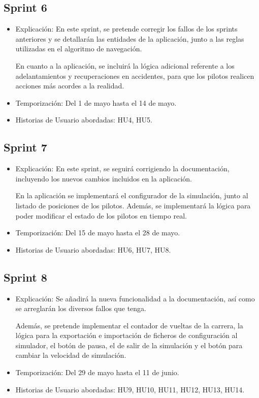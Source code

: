 \newpage

\subsection{Sprint 6}

\begin{itemize}
    \item Explicación: En este sprint, se pretende corregir los fallos de los sprints anteriores y se detallarán las entidades de la aplicación, junto a las reglas utilizadas en el algoritmo de navegación.
    
    En cuanto a la aplicación, se incluirá la lógica adicional referente a los adelantamientos y recuperaciones en accidentes, para que los pilotos realicen acciones más acordes a la realidad.
    

    \item Temporización: Del 1 de mayo hasta el 14 de mayo.
    \item Historias de Usuario abordadas: HU4, HU5.
\end{itemize}

\subsection{Sprint 7}

\begin{itemize}
    \item Explicación: En este sprint, se seguirá corrigiendo la documentación, incluyendo los nuevos cambios incluidos en la aplicación.
    
    En la aplicación se implementará el configurador de la simulación, junto al listado de posiciones de los pilotos. Además, se implementará la lógica para poder modificar el estado de los pilotos en tiempo real.
    
    \item Temporización: Del 15 de mayo hasta el 28 de mayo.
    \item Historias de Usuario abordadas: HU6, HU7, HU8.
\end{itemize}

\subsection{Sprint 8}

\begin{itemize}
    \item Explicación: Se añadirá la nueva funcionalidad a la documentación, así como se arreglarán los diversos fallos que tenga.
    
    Además, se pretende implementar el contador de vueltas de la carrera, la lógica para la exportación e importación de ficheros de configuración al simulador, el botón de pausa, el de salir de la simulación y el botón para cambiar la velocidad de simulación.

    \item Temporización: Del 29 de mayo hasta el 11 de junio.
    \item Historias de Usuario abordadas: HU9, HU10, HU11, HU12, HU13, HU14.
\end{itemize}

